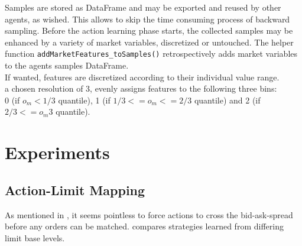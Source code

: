 Samples are stored as DataFrame and may be exported and reused by other agents, as wished. This allows to skip the time consuming process of backward sampling. Before the action learning phase starts, the collected samples may be enhanced by a variety of market variables, discretized or untouched. The helper function \lstinline!addMarketFeatures_toSamples()! retrospectively adds market variables to the agents samples DataFrame.\\

If wanted, features are discretized according to their individual value range.\\
\Eg a chosen resolution of 3, evenly assigns features to the following three bins:\\
0 (if $o_m< 1/3$ quantile), 1 (if $1/3 <= o_m <= 2/3$ quantile) and 2 (if $2/3 <= o_m3$ quantile).


\section{Experiments}
\label{chap:experiments}
\subsection{Action-Limit Mapping}
\label{chap:exp:actionlimitmapping}
As mentioned in , it seems pointless to force actions to cross the bid-ask-spread before any orders can be matched.  compares strategies learned from differing limit base levels.

